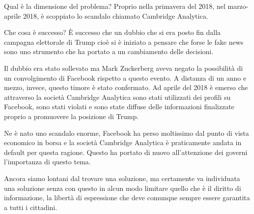 Qual è la dimensione del problema? Proprio nella primavera del 2018, nel marzo-aprile 2018, è scoppiato lo scandalo chiamato Cambridge Analytica. 

Che cosa è successo? È successo che un dubbio che si era posto fin dalla campagna elettorale di Trump cioè si è iniziato a pensare che forse le fake news sono uno strumento che ha portato a un cambiamento delle decisioni.

Il dubbio era stato sollevato ma Mark Zuckerberg aveva negato la possibilità di un convolgimento di Facebook rispetto a questo evento. A distanza di un anno e mezzo, invece, questo timore è stato confermato. Ad aprile del 2018 è emerso che attraverso la società Cambridge Analytica sono stati utilizzati dei profili su Facebook, sono stati violati e sono state diffuse delle informazioni finalizzate proprio a promuovere la posizione di Trump.

Ne è nato uno scandalo enorme, Facebook ha perso moltissimo dal punto di vista economico in borsa e la società Cambridge Analytica è praticamente andata in default per questa ragione. Questo ha portato di nuovo all'attenzione dei governi l'importanza di questo tema. 

Ancora siamo lontani dal trovare una soluzione, ma certamente va individuata una soluzione senza con questo in alcun modo limitare quello che è il diritto di informazione, la libertà di espressione che deve comunque sempre essere garantita a tutti i cittadini. 